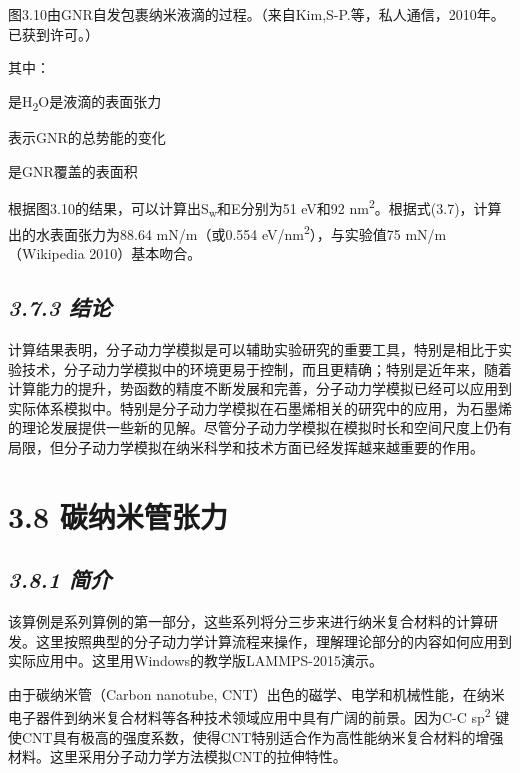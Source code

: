 图3.10由GNR自发包裹纳米液滴的过程。（来自Kim,S-P.等，私人通信，2010年。已获到许可。）

其中：

是H\textsubscript{2}O是液滴的表面张力

表示GNR的总势能的变化

是GNR覆盖的表面积

根据图3.10的结果，可以计算出S\textsubscript{w}和E分别为51 eV和92
nm\textsuperscript{2}。根据式(3.7)，计算出的水表面张力为88.64
mN/m（或0.554 eV/nm\textsuperscript{2}），与实验值75 mN/m（Wikipedia
2010）基本吻合。

\hypertarget{ux7ed3ux8bba-1}{%
\subsection{\texorpdfstring{\emph{3.7.3
结论}}{3.7.3 结论}}\label{ux7ed3ux8bba-1}}

计算结果表明，分子动力学模拟是可以辅助实验研究的重要工具，特别是相比于实验技术，分子动力学模拟中的环境更易于控制，而且更精确；特别是近年来，随着计算能力的提升，势函数的精度不断发展和完善，分子动力学模拟已经可以应用到实际体系模拟中。特别是分子动力学模拟在石墨烯相关的研究中的应用，为石墨烯的理论发展提供一些新的见解。尽管分子动力学模拟在模拟时长和空间尺度上仍有局限，但分子动力学模拟在纳米科学和技术方面已经发挥越来越重要的作用。

\hypertarget{ux78b3ux7eb3ux7c73ux7ba1ux5f20ux529b}{%
\section{3.8 碳纳米管张力}\label{ux78b3ux7eb3ux7c73ux7ba1ux5f20ux529b}}

\hypertarget{ux7b80ux4ecb}{%
\subsection{\texorpdfstring{\emph{3.8.1
简介}}{3.8.1 简介}}\label{ux7b80ux4ecb}}

该算例是系列算例的第一部分，这些系列将分三步来进行纳米复合材料的计算研发。这里按照典型的分子动力学计算流程来操作，理解理论部分的内容如何应用到实际应用中。这里用Windows的教学版LAMMPS-2015演示。

由于碳纳米管（Carbon nanotube,
CNT）出色的磁学、电学和机械性能，在纳米电子器件到纳米复合材料等各种技术领域应用中具有广阔的前景。因为C-C
sp\textsuperscript{2}
键使CNT具有极高的强度系数，使得CNT特别适合作为高性能纳米复合材料的增强材料。这里采用分子动力学方法模拟CNT的拉伸特性。

